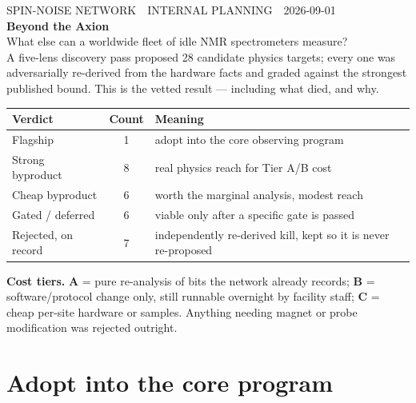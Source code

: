 \documentclass[11pt]{article}
\begin{document}
\begin{center}
{\footnotesize\textsf{\textcolor{inkfaint}{SPIN-NOISE NETWORK \,\textperiodcentered\, INTERNAL PLANNING \,\textperiodcentered\, 2026-09-01}}}\\[10pt]
{\Huge\bfseries Beyond the Axion}\\[10pt]
{\large What else can a worldwide fleet of idle NMR spectrometers measure?}\\[4pt]
{\small\textcolor{inkfaint}{A five-lens discovery pass proposed 28 candidate physics targets; every one was
adversarially re-derived from the hardware facts and graded against the strongest
published bound. This is the vetted result --- including what died, and why.}}
\end{center}

\vspace{6pt}
\begin{center}
\begin{tabular}{@{}lcl@{}}
\toprule
\textbf{Verdict} & \textbf{Count} & \textbf{Meaning} \\
\midrule
Flagship          & 1 & adopt into the core observing program \\
Strong byproduct  & 8 & real physics reach for Tier A/B cost \\
Cheap byproduct   & 6 & worth the marginal analysis, modest reach \\
Gated / deferred  & 6 & viable only after a specific gate is passed \\
Rejected, on record & 7 & independently re-derived kill, kept so it is never re-proposed \\
\bottomrule
\end{tabular}
\end{center}

\vspace{4pt}
\noindent\textbf{Cost tiers.} \textbf{A} = pure re-analysis of bits the network already
records; \textbf{B} = software/protocol change only, still runnable overnight by
facility staff; \textbf{C} = cheap per-site hardware or samples. Anything needing
magnet or probe modification was rejected outright.

\section{Adopt into the core program}
\end{document}
